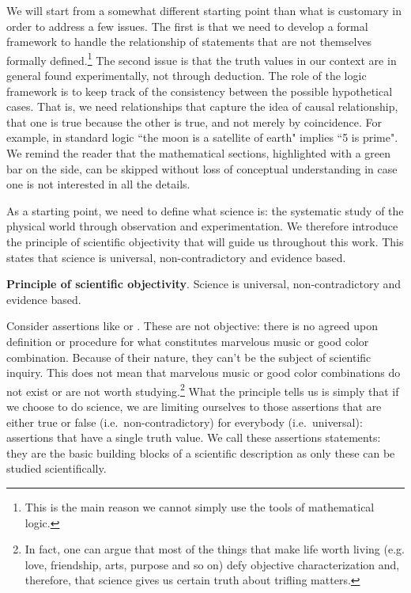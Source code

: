 \documentclass[11pt,letterpaper,fleqn]{memoir} %
\begin{document}
We will start from a somewhat different starting point than what is customary in order to address a few issues. The first is that we need to develop a formal framework to handle the relationship of statements that are not themselves formally defined.\footnote{This is the main reason we cannot simply use the tools of mathematical logic.} The second issue is that the truth values in our context are in general found experimentally, not through deduction. The role of the logic framework is to keep track of the consistency between the possible hypothetical cases. That is, we need relationships that capture the idea of causal relationship, that one is true because the other is true, and not merely by coincidence. For example, in standard logic ``the moon is a satellite of earth" implies ``5 is prime". We remind the reader that the mathematical sections, highlighted with a green bar on the side, can be skipped without loss of conceptual understanding in case one is not interested in all the details. 

As a starting point, we need to define what science is: the systematic study of the physical world through observation and experimentation. We therefore introduce the principle of scientific objectivity that will guide us throughout this work. This states that science is universal, non-contradictory and evidence based.

\begin{mathSection}
	\textbf{Principle of scientific objectivity}.
		Science is universal, non-contradictory and evidence based.
\end{mathSection}

Consider assertions like  or . These are not objective: there is no agreed upon definition or procedure for what constitutes marvelous music or good color combination. Because of their nature, they can't be the subject of scientific inquiry. This does not mean that marvelous music or good color combinations do not exist or are not worth studying.\footnote{In fact, one can argue that most of the things that make life worth living (e.g. love, friendship, arts, purpose and so on) defy objective characterization and, therefore, that science gives us certain truth about trifling matters.} What the principle tells us is simply that if we choose to do science, we are limiting ourselves to those assertions that are either true or false (i.e.~non-contradictory) for everybody (i.e.~universal): assertions that have a single truth value. We call these assertions statements: they are the basic building blocks of a scientific description as only these can be studied scientifically.
\end{document}

